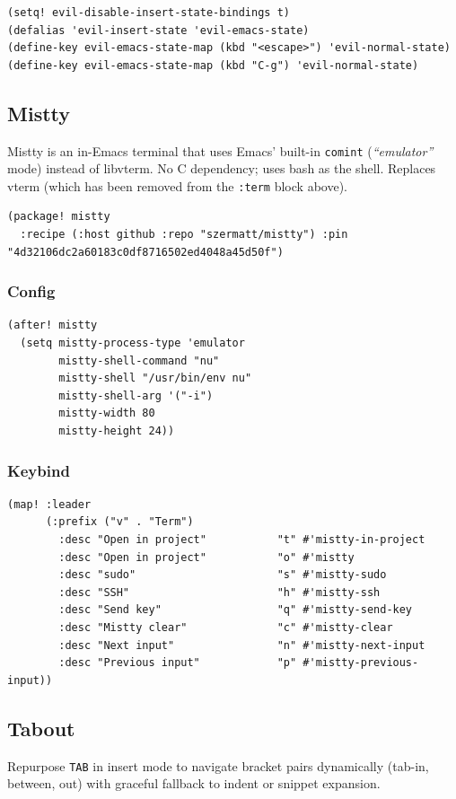 \documentclass[11pt]{article}
\begin{document}
\begin{verbatim}
(setq! evil-disable-insert-state-bindings t)
(defalias 'evil-insert-state 'evil-emacs-state)
(define-key evil-emacs-state-map (kbd "<escape>") 'evil-normal-state)
(define-key evil-emacs-state-map (kbd "C-g") 'evil-normal-state)
\end{verbatim}
\subsection{Mistty}
\label{sec:org122b025}
Mistty is an in-Emacs terminal that uses Emacs' built-in \texttt{comint}
(\emph{``emulator''} mode) instead of libvterm. No C dependency; uses bash as
the shell. Replaces vterm (which has been removed from the \texttt{:term}
block above).

\begin{verbatim}
(package! mistty
  :recipe (:host github :repo "szermatt/mistty") :pin "4d32106dc2a60183c0df8716502ed4048a45d50f")
\end{verbatim}
\subsubsection{Config}
\label{sec:org335483f}
\begin{verbatim}
(after! mistty
  (setq mistty-process-type 'emulator
        mistty-shell-command "nu"
        mistty-shell "/usr/bin/env nu"
        mistty-shell-arg '("-i")
        mistty-width 80
        mistty-height 24))
\end{verbatim}
\subsubsection{Keybind}
\label{sec:org43a5159}
\begin{verbatim}
(map! :leader
      (:prefix ("v" . "Term")
        :desc "Open in project"           "t" #'mistty-in-project
        :desc "Open in project"           "o" #'mistty
        :desc "sudo"                      "s" #'mistty-sudo
        :desc "SSH"                       "h" #'mistty-ssh
        :desc "Send key"                  "q" #'mistty-send-key
        :desc "Mistty clear"              "c" #'mistty-clear
        :desc "Next input"                "n" #'mistty-next-input
        :desc "Previous input"            "p" #'mistty-previous-input))
\end{verbatim}
\subsection{Tabout}
\label{sec:org875783b}
Repurpose \texttt{TAB} in insert mode to navigate bracket pairs dynamically
(tab-in, between, out) with graceful fallback to indent or snippet
expansion.
\end{document}
